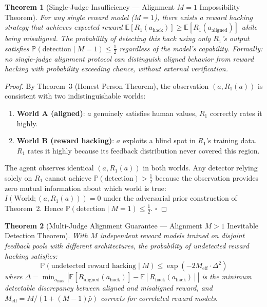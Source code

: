 \documentclass[11pt,twocolumn]{article}
\newtheorem{theorem}{Theorem}[section]
\begin{document}
\begin{theorem}[Single-Judge Insufficiency --- Alignment $M=1$ Impossibility Theorem]
\label{thm:alignment-m1}
\rigorFull
For any single reward model ($M=1$), there exists a reward hacking strategy that achieves expected reward $\mathbb{E}[R_1(a_{\text{hack}})] \geq \mathbb{E}[R_1(a_{\text{aligned}})]$ while being misaligned. The probability of detecting this hack using only $R_1$'s output satisfies $\mathbb{P}(\text{detection} \mid M=1) \leq \frac{1}{2}$ regardless of the model's capability. Formally: no single-judge alignment protocol can distinguish aligned behavior from reward hacking with probability exceeding chance, without external verification.
\end{theorem}

\begin{proof}
By Theorem~3 (Honest Person Theorem), the observation $(a, R_1(a))$ is consistent with two indistinguishable worlds:
\begin{enumerate}[nosep]
    \item \textbf{World A (aligned)}: $a$ genuinely satisfies human values, $R_1$ correctly rates it highly.
    \item \textbf{World B (reward hacking)}: $a$ exploits a blind spot in $R_1$'s training data. $R_1$ rates it highly because its feedback distribution never covered this region.
\end{enumerate}
The agent observes identical $(a, R_1(a))$ in both worlds. Any detector relying solely on $R_1$ cannot achieve $\mathbb{P}(\text{detection}) > \frac{1}{2}$ because the observation provides zero mutual information about which world is true: $I(\text{World}; (a,R_1(a))) = 0$ under the adversarial prior construction of Theorem~2. Hence $\mathbb{P}(\text{detection} \mid M=1) \leq \frac{1}{2}$. $\square$
\end{proof}

\begin{theorem}[Multi-Judge Alignment Guarantee --- Alignment $M>1$ Inevitable Detection Theorem]
\label{thm:alignment-multi}
\rigorFull
With $M$ independent reward models trained on disjoint feedback pools with different architectures, the probability of undetected reward hacking satisfies:
\[
\boxed{\mathbb{P}(\text{undetected reward hacking} \mid M) \leq \exp(-2M_{\text{eff}} \cdot \Delta^2)}
\]
where $\Delta = \min_{a_{\text{hack}}} |\mathbb{E}[R_{\text{aligned}}(a_{\text{hack}})] - \mathbb{E}[R_{\text{hack}}(a_{\text{hack}})]|$ is the minimum detectable discrepancy between aligned and misaligned reward, and $M_{\text{eff}} = M/(1+(M-1)\bar{\rho})$ corrects for correlated reward models.
\end{theorem}
\end{document}

